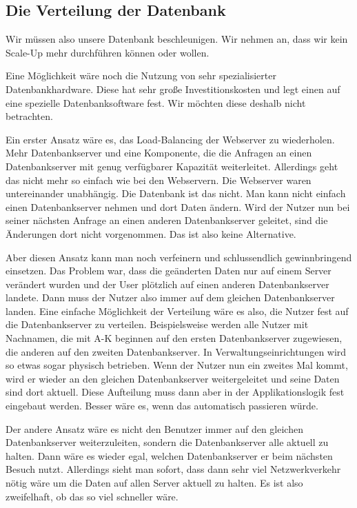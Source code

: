 \subsection{Die Verteilung der Datenbank}
Wir müssen also unsere Datenbank beschleunigen. Wir nehmen an, dass wir kein Scale-Up mehr durchführen können oder
wollen.

Eine Möglichkeit wäre noch die Nutzung von sehr spezialisierter Datenbankhardware. Diese hat sehr große Investitionskosten
und legt einen auf eine spezielle Datenbanksoftware fest. Wir möchten diese deshalb nicht betrachten.

Ein erster Ansatz wäre es, das Load-Balancing der Webserver zu wiederholen. Mehr Datenbankserver und eine Komponente,
die die Anfragen an einen Datenbankserver mit genug verfügbarer Kapazität weiterleitet. Allerdings geht das
nicht mehr so einfach wie bei den Webservern. Die Webserver waren untereinander unabhängig. Die Datenbank ist
das nicht. Man kann nicht einfach einen Datenbankserver nehmen und dort Daten ändern. Wird der Nutzer nun
bei seiner nächsten Anfrage an einen anderen Datenbankserver geleitet, sind die Änderungen dort nicht vorgenommen.
Das ist also keine Alternative.

Aber diesen Ansatz kann man noch verfeinern und schlussendlich gewinnbringend einsetzen.  Das Problem war,
dass die geänderten Daten nur auf einem Server verändert wurden und der User plötzlich auf einen anderen
Datenbankserver landete. Dann muss der Nutzer also immer auf dem gleichen Datenbankserver landen.
Eine einfache Möglichkeit der Verteilung wäre es also, die Nutzer fest auf die Datenbankserver zu verteilen.
Beispielsweise werden alle Nutzer mit Nachnamen, die mit A-K beginnen auf den ersten Datenbankserver zugewiesen,
die anderen auf den zweiten Datenbankserver. In Verwaltungseinrichtungen wird so etwas sogar physisch betrieben.
Wenn der Nutzer nun ein zweites Mal kommt, wird er wieder an den gleichen Datenbankserver weitergeleitet und
seine Daten sind dort aktuell. Diese Aufteilung muss dann aber in der Applikationslogik fest eingebaut werden.
Besser wäre es, wenn das automatisch passieren würde.

Der andere Ansatz wäre es nicht den Benutzer immer auf den gleichen Datenbankserver weiterzuleiten, sondern
die Datenbankserver alle aktuell zu halten. Dann wäre es wieder egal, welchen Datenbankserver er beim nächsten
Besuch nutzt. Allerdings sieht man sofort, dass dann sehr viel Netzwerkverkehr nötig wäre um die Daten auf allen
Server aktuell zu halten. Es ist also zweifelhaft, ob das so viel schneller wäre.

